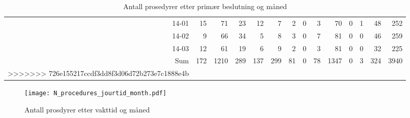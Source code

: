 \documentclass[presentation,xcolor=pdftex,dvipsnames,table]{beamer}
\begin{document}
\begin{frame}
\begin{tiny}
\begin{table}[ht]
\begin{tabular}{rrrrrrrrrrrrrr}
  14-01 & 15 & 71 & 23 & 12 & 7 & 2 & 0 & 3 & 70 & 0 & 1 & 48 & 252 \\ 
  14-02 & 9 & 66 & 34 & 5 & 8 & 3 & 0 & 7 & 81 & 0 & 0 & 46 & 259 \\ 
  14-03 & 12 & 61 & 19 & 6 & 9 & 2 & 0 & 3 & 81 & 0 & 0 & 32 & 225 \\ 
  Sum & 172 & 1210 & 289 & 137 & 299 & 81 & 0 & 78 & 1347 & 0 & 3 & 324 & 3940 \\ 
>>>>>>> 726e155217ccdf3dd8f3d06d72b273e7c1888e4b
   \bottomrule
\end{tabular}
\caption{Antall prosedyrer etter primær beslutning og måned} 
\end{table}\end{tiny}
\end{frame}




\begin{frame}
\begin{figure}
  \centering
  \caption{Antall prosdyrer etter vakttid og måned}
\texttt{[image: N\_procedures\_jourtid\_month.pdf]}
\end{figure}\end{frame}
\end{document}
